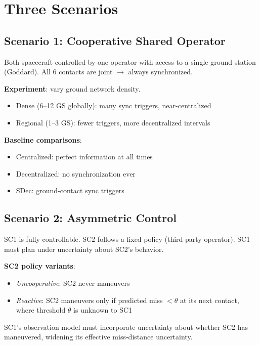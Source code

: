 \documentclass[11pt]{article}
\begin{document}
\section{Three Scenarios}

\subsection{Scenario 1: Cooperative Shared Operator}

Both spacecraft controlled by one operator with access to a single ground
station (Goddard). All 6 contacts are joint $\rightarrow$ always synchronized.

\textbf{Experiment}: vary ground network density.
\begin{itemize}
  \item Dense (6--12 GS globally): many sync triggers, near-centralized
  \item Regional (1--3 GS): fewer triggers, more decentralized intervals
\end{itemize}

\textbf{Baseline comparisons}:
\begin{itemize}
  \item Centralized: perfect information at all times
  \item Decentralized: no synchronization ever
  \item SDec: ground-contact sync triggers
\end{itemize}

\subsection{Scenario 2: Asymmetric Control}

SC1 is fully controllable. SC2 follows a fixed policy (third-party operator).
SC1 must plan under uncertainty about SC2's behavior.

\textbf{SC2 policy variants}:
\begin{itemize}
  \item \textit{Uncooperative}: SC2 never maneuvers
  \item \textit{Reactive}: SC2 maneuvers only if predicted miss $< \theta$ at
        its next contact, where threshold $\theta$ is unknown to SC1
\end{itemize}

SC1's observation model must incorporate uncertainty about whether SC2 has
maneuvered, widening its effective miss-distance uncertainty.
\end{document}
